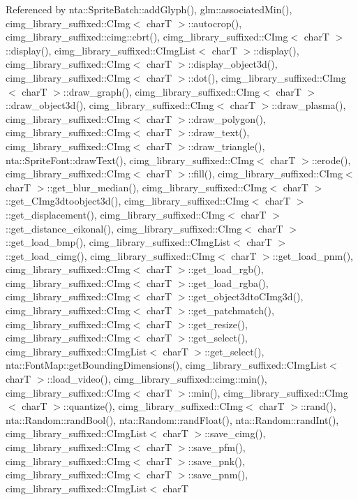 Referenced by nta\+::\+Sprite\+Batch\+::add\+Glyph(), glm\+::associated\+Min(), cimg\+\_\+library\+\_\+suffixed\+::\+C\+Img$<$ char\+T $>$\+::autocrop(), cimg\+\_\+library\+\_\+suffixed\+::cimg\+::cbrt(), cimg\+\_\+library\+\_\+suffixed\+::\+C\+Img$<$ char\+T $>$\+::display(), cimg\+\_\+library\+\_\+suffixed\+::\+C\+Img\+List$<$ char\+T $>$\+::display(), cimg\+\_\+library\+\_\+suffixed\+::\+C\+Img$<$ char\+T $>$\+::display\+\_\+object3d(), cimg\+\_\+library\+\_\+suffixed\+::\+C\+Img$<$ char\+T $>$\+::dot(), cimg\+\_\+library\+\_\+suffixed\+::\+C\+Img$<$ char\+T $>$\+::draw\+\_\+graph(), cimg\+\_\+library\+\_\+suffixed\+::\+C\+Img$<$ char\+T $>$\+::draw\+\_\+object3d(), cimg\+\_\+library\+\_\+suffixed\+::\+C\+Img$<$ char\+T $>$\+::draw\+\_\+plasma(), cimg\+\_\+library\+\_\+suffixed\+::\+C\+Img$<$ char\+T $>$\+::draw\+\_\+polygon(), cimg\+\_\+library\+\_\+suffixed\+::\+C\+Img$<$ char\+T $>$\+::draw\+\_\+text(), cimg\+\_\+library\+\_\+suffixed\+::\+C\+Img$<$ char\+T $>$\+::draw\+\_\+triangle(), nta\+::\+Sprite\+Font\+::draw\+Text(), cimg\+\_\+library\+\_\+suffixed\+::\+C\+Img$<$ char\+T $>$\+::erode(), cimg\+\_\+library\+\_\+suffixed\+::\+C\+Img$<$ char\+T $>$\+::fill(), cimg\+\_\+library\+\_\+suffixed\+::\+C\+Img$<$ char\+T $>$\+::get\+\_\+blur\+\_\+median(), cimg\+\_\+library\+\_\+suffixed\+::\+C\+Img$<$ char\+T $>$\+::get\+\_\+\+C\+Img3dtoobject3d(), cimg\+\_\+library\+\_\+suffixed\+::\+C\+Img$<$ char\+T $>$\+::get\+\_\+displacement(), cimg\+\_\+library\+\_\+suffixed\+::\+C\+Img$<$ char\+T $>$\+::get\+\_\+distance\+\_\+eikonal(), cimg\+\_\+library\+\_\+suffixed\+::\+C\+Img$<$ char\+T $>$\+::get\+\_\+load\+\_\+bmp(), cimg\+\_\+library\+\_\+suffixed\+::\+C\+Img\+List$<$ char\+T $>$\+::get\+\_\+load\+\_\+cimg(), cimg\+\_\+library\+\_\+suffixed\+::\+C\+Img$<$ char\+T $>$\+::get\+\_\+load\+\_\+pnm(), cimg\+\_\+library\+\_\+suffixed\+::\+C\+Img$<$ char\+T $>$\+::get\+\_\+load\+\_\+rgb(), cimg\+\_\+library\+\_\+suffixed\+::\+C\+Img$<$ char\+T $>$\+::get\+\_\+load\+\_\+rgba(), cimg\+\_\+library\+\_\+suffixed\+::\+C\+Img$<$ char\+T $>$\+::get\+\_\+object3dto\+C\+Img3d(), cimg\+\_\+library\+\_\+suffixed\+::\+C\+Img$<$ char\+T $>$\+::get\+\_\+patchmatch(), cimg\+\_\+library\+\_\+suffixed\+::\+C\+Img$<$ char\+T $>$\+::get\+\_\+resize(), cimg\+\_\+library\+\_\+suffixed\+::\+C\+Img$<$ char\+T $>$\+::get\+\_\+select(), cimg\+\_\+library\+\_\+suffixed\+::\+C\+Img\+List$<$ char\+T $>$\+::get\+\_\+select(), nta\+::\+Font\+Map\+::get\+Bounding\+Dimensions(), cimg\+\_\+library\+\_\+suffixed\+::\+C\+Img\+List$<$ char\+T $>$\+::load\+\_\+video(), cimg\+\_\+library\+\_\+suffixed\+::cimg\+::min(), cimg\+\_\+library\+\_\+suffixed\+::\+C\+Img$<$ char\+T $>$\+::min(), cimg\+\_\+library\+\_\+suffixed\+::\+C\+Img$<$ char\+T $>$\+::quantize(), cimg\+\_\+library\+\_\+suffixed\+::\+C\+Img$<$ char\+T $>$\+::rand(), nta\+::\+Random\+::rand\+Bool(), nta\+::\+Random\+::rand\+Float(), nta\+::\+Random\+::rand\+Int(), cimg\+\_\+library\+\_\+suffixed\+::\+C\+Img\+List$<$ char\+T $>$\+::save\+\_\+cimg(), cimg\+\_\+library\+\_\+suffixed\+::\+C\+Img$<$ char\+T $>$\+::save\+\_\+pfm(), cimg\+\_\+library\+\_\+suffixed\+::\+C\+Img$<$ char\+T $>$\+::save\+\_\+pnk(), cimg\+\_\+library\+\_\+suffixed\+::\+C\+Img$<$ char\+T $>$\+::save\+\_\+pnm(), cimg\+\_\+library\+\_\+suffixed\+::\+C\+Img\+List$<$ char\+T 